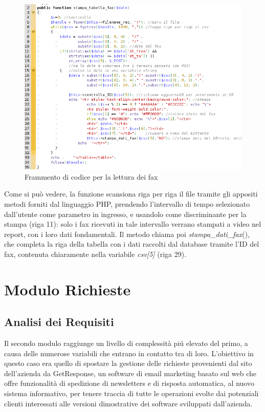 \begin{figure}[!ht]
\centering
  \includegraphics[scale=0.6]{./images/codicefax.png}
\caption{Frammento di codice per la lettura dei fax}
\label{codice_fax}
\end{figure}

\noindent
Come si pu\`o vedere, la funzione scansiona riga per riga il file tramite gli appositi metodi forniti dal linguaggio PHP, prendendo l'intervallo di tempo selezionato dall'utente come parametro in ingresso, e usandolo come discriminante per la stampa (riga 11): solo i fax ricevuti in tale intervallo verrano stampati a video nel report, con i loro dati fondamentali. Il metodo chiama poi \textit{stampa\_{}dati\_{}fax}(), che completa la riga della tabella con i dati raccolti dal database tramite l'ID del fax, contenuta chiaramente nella variabile \textit{csv[5]} (riga 29).


\chapter{Modulo Richieste}
\section{Analisi dei Requisiti}
Il secondo modulo raggiunge un livello di complessit\`a pi\'u elevato del primo, a causa delle numerose variabili che entrano in contatto tra di loro. L'obiettivo in questo caso era quello di spostare la gestione delle richieste provenienti dal sito dell'azienda da GetResponse, un software di email marketing basato sul web che offre funzionalit\`a di spedizione di newsletters e di risposta automatica, al nuovo sistema informativo, per tenere traccia di tutte le operazioni svolte dai potenziali clienti interessati alle versioni dimostrative dei software sviluppati dall'azienda. 

